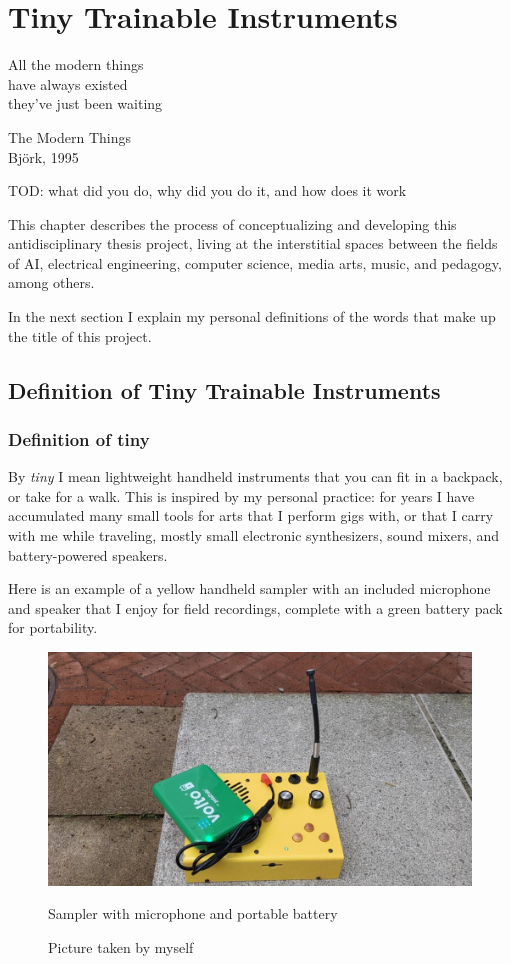 \chapter{Tiny Trainable Instruments}

\epigraph{All the modern things \\ have always existed \\ they've just been waiting}{The Modern Things \\ Björk, 1995}

TOD: what did you do, why did you do it, and how does it work

This chapter describes the process of conceptualizing and developing this antidisciplinary thesis project, living at the interstitial spaces between the fields of \acrlong{AI}, electrical engineering, computer science, media arts, music, and pedagogy, among others.

In the next section I explain my personal definitions of the words that make up the title of this project.

\section{Definition of Tiny Trainable Instruments}

\subsection{Definition of tiny}

By \emph{tiny} I mean lightweight handheld instruments that you can fit in a backpack, or take for a walk. This is inspired by my personal practice: for years I have accumulated many small tools for arts that I perform gigs with, or that I carry with me while traveling, mostly small electronic synthesizers, sound mixers, and battery-powered speakers.

Here is an example of a yellow handheld sampler with an included microphone and speaker that I enjoy for field recordings, complete with a green battery pack for portability.

\begin{figure}[ht]
  \centering
  \includegraphics[width=0.75\linewidth,height=0.25\textheight,keepaspectratio]{images/critter-and-guitari-kaleidoloop-battery.jpg}
  \caption{Sampler with microphone and portable battery}
  \caption*{Picture taken by myself}
  \label{fig:critter-and-guitari-kaleidoloop-battery}
\end{figure}

